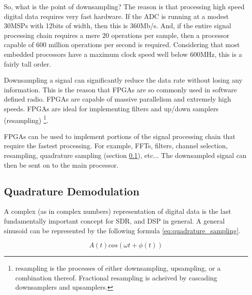 \documentclass[a4paper, 12pt]{article}
\begin{document}
So, what is the point of downsampling?  The reason is that processing high speed digital data requires very fast hardware.  If the ADC is running at a modest 30MSPs with 12bits of width, then this is 360Mb/s.  And, if the entire signal processing chain requires a mere 20 operations per sample, then a processor capable of 600 million operations per second is required.  Considering that most embedded processors have a maximum clock speed well below 600MHz, this is a fairly tall order.

Downsampling a signal can significantly reduce the data rate without losing any information.  This is the reason that FPGAs are so commonly used in software defined radio.  FPGAs are capable of massive parallelism and extremely high speeds.  FPGAs are ideal for implementing filters and up/down samplers (resampling) \footnote{resampling is the processes of either downsampling, upsampling, or a combination thereof.  Fractional resampling is acheived by cascading downsamplers and upsamplers.}.

FPGAs can be used to implement portions of the signal processing chain that require the fastest processing.  For example, FFTs, filters, channel selection, resampling, quadrature sampling (section \ref{sec:quadrature_sampling}), etc...  The downsampled signal can then be sent on to the main processor.


\subsection{Quadrature Demodulation}
\label{sec:quadrature_sampling}
A complex (as in complex numbers) representation of digital data is the last fundamentally important concept for SDR, and DSP in general.  A general sinusoid can be represented by the following formula \ref{eq:quadrature_sampling}.

\begin{equation}
\label{eq:quadrature_sampling}
A(t)cos(\omega t + \phi (t))
\end{equation}
\end{document}

